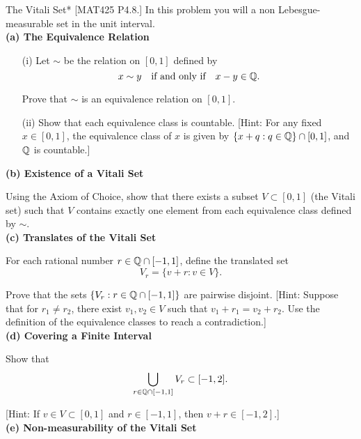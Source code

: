 \begin{problem}{The Vitali Set}*
    [MAT425 P4.8.] In this problem you will a non Lebesgue-measurable set in the unit interval. \\

    \stdvspace
    \textbf{(a) The Equivalence Relation}

    \begin{itemize}
    \item[(i)] Let $\sim$ be the relation on $[0,1]$ defined by
    $$
        x \sim y \quad \text{if and only if} \quad x - y \in \mathbb{Q}.
    $$

    Prove that $\sim$ is an equivalence relation on $[0,1]$.

    \item[(ii)] Show that each equivalence class is countable. [Hint: For any fixed $x \in [0,1]$, the equivalence class of $x$ is given by $\{x + q : q \in \mathbb{Q} \} \cap [0,1]$, and $\mathbb{Q}$ is countable.]
    \end{itemize}

    \stdvspace
    \textbf{(b) Existence of a Vitali Set}
    \stdvspace

    Using the Axiom of Choice, show that there exists a subset $V \subset [0,1]$ (the Vitali set) such that $V$ contains exactly one element from each equivalence class defined by $\sim$. \\

    \stdvspace
    \textbf{(c) Translates of the Vitali Set}
    \stdvspace

    For each rational number $r \in \mathbb{Q} \cap [-1,1]$, define the translated set
    $$
    V_r = \{ v + r : v \in V \}.
    $$

    Prove that the sets $\{V_r : r \in \mathbb{Q} \cap [-1,1]\}$ are pairwise disjoint. [Hint: Suppose that for $r_1 \ne r_2$, there exist $v_1, v_2 \in V$ such that $v_1 + r_1 = v_2 + r_2$. Use the definition of the equivalence classes to reach a contradiction.] \\

    \stdvspace
    \textbf{(d) Covering a Finite Interval}
    \stdvspace

    Show that
    $$
    \bigcup_{r \in \mathbb{Q} \cap [-1,1]} V_r \subset [-1,2].
    $$

    [Hint: If $v \in V \subset [0,1]$ and $r \in [-1,1]$, then $v + r \in [-1,2]$.] \\

    \stdvspace
    \textbf{(e) Non-measurability of the Vitali Set}
    \stdvspace


\end{problem}
